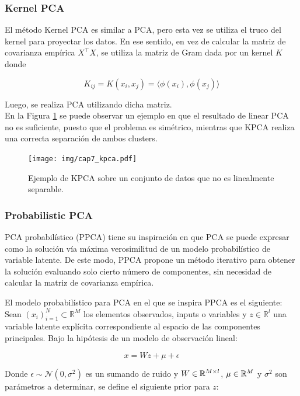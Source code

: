 \subsubsection{Kernel PCA}
El método Kernel PCA es similar a PCA, pero esta vez se utiliza el truco del kernel para proyectar los datos. En ese sentido, en vez de calcular la matriz de covarianza empírica $X^\top X$, se utiliza la matriz de Gram dada por un kernel $K$ donde

$$
K_{ij} = K(x_i,x_j) = \langle\phi(x_i),\phi(x_j)\rangle
$$

Luego, se realiza PCA utilizando dicha matriz.\\

En la Figura \ref{fig:kpca} se puede observar un ejemplo en que el resultado de linear PCA no es suficiente, puesto que el problema es simétrico, mientras que KPCA realiza una correcta separación de ambos clusters.

\begin{figure}[ht]
    \centering
    \texttt{[image: img/cap7\_kpca.pdf]}
    \caption{Ejemplo de KPCA sobre un conjunto de datos que no es linealmente separable.}
    \label{fig:kpca}
\end{figure}

\subsubsection{Probabilistic PCA}
PCA probabilístico (PPCA) tiene su inspiración en que PCA se puede expresar como la solución vía máxima verosimilitud de un modelo probabilístico de variable latente. De este modo, PPCA propone un método iterativo para obtener la solución evaluando solo cierto número de componentes, sin necesidad de calcular la matriz de covarianza empírica.

El modelo probabilístico para PCA en el que se inspira PPCA es el siguiente:\\

Sean $(x_i)_{i=1}^N\subset \mathbb{R}^M$ los elementos observados, inputs o variables y $z\in \mathbb{R}^l$ una variable latente explícita correspondiente al espacio de las componentes principales. Bajo la hipótesis de un modelo de observación lineal:

\begin{equation}
	x=Wz+\mu+\epsilon
\end{equation}

Donde $\epsilon\sim\mathcal{N}(0,\sigma^2)$ es un sumando de ruido y $W\in \mathbb{R}^{M\times l}$, $\mu \in \mathbb{R}^M$ y $\sigma^2$ son parámetros a determinar, se define el siguiente prior para $z$:

